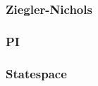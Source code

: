 \documentclass[../../../main]{subfiles}
\begin{document}
\subsubsection{Ziegler-Nichols}%
\label{sub:ziegler_nichols}




\subsubsection{PI}%
\label{sub:pi}



\subsubsection{Statespace}%
\label{sub:statespace}

\end{document}
